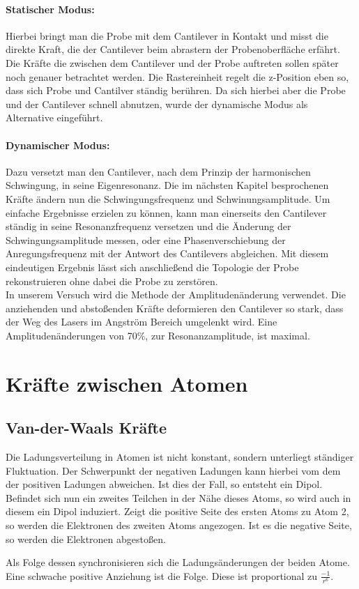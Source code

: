 \paragraph{Statischer Modus:}

Hierbei bringt man die Probe mit dem Cantilever in Kontakt und misst die direkte Kraft, die der Cantilever beim abrastern der Probenoberfläche erfährt. 
Die Kräfte die zwischen dem Cantilever und der Probe auftreten sollen später noch genauer betrachtet werden.
Die Rastereinheit regelt die z-Position eben so, dass sich Probe und Cantilver ständig berühren.
Da sich hierbei aber die Probe und der Cantilever schnell abnutzen, wurde der 
dynamische Modus als Alternative eingeführt.

\paragraph{Dynamischer Modus:}

Dazu versetzt man den Cantilever, nach dem Prinzip der harmonischen Schwingung, in seine Eigenresonanz.
Die im nächsten Kapitel besprochenen Kräfte ändern nun die Schwingungsfrequenz und Schwinungsamplitude.
Um einfache Ergebnisse erzielen zu können, kann man einerseits den Cantilever ständig in seine Resonanzfrequenz versetzen und die Änderung der Schwingungsamplitude messen, oder eine Phasenverschiebung der Anregungsfrequenz mit der Antwort des Cantilevers abgleichen.
Mit diesem eindeutigen Ergebnis lässt sich anschließend die Topologie der Probe rekonstruieren ohne dabei die Probe zu zerstören.
\vspace{6pt}\\
In unserem Versuch wird die Methode der Amplitudenänderung verwendet. 
Die anziehenden und abstoßenden Kräfte deformieren den Cantilever so stark, dass der Weg des Lasers im Angström Bereich umgelenkt wird. 
Eine Amplitudenänderungen von 70\%, zur Resonanzamplitude, ist maximal. 


    \section{Kräfte zwischen Atomen}
        \subsection{Van-der-Waals Kräfte}

Die Ladungsverteilung in Atomen ist nicht konstant, sondern unterliegt ständiger 
Fluktuation. Der Schwerpunkt der negativen Ladungen kann hierbei vom dem der
positiven Ladungen abweichen. Ist dies der Fall, so entsteht ein Dipol. 
Befindet sich nun ein zweites Teilchen in der Nähe dieses Atoms, so wird auch
in diesem ein Dipol induziert. Zeigt die positive Seite des ersten Atoms zu Atom 2,
so werden die Elektronen des zweiten Atoms angezogen. Ist es die negative Seite, so
werden die Elektronen abgestoßen. \par
Als Folge dessen synchronisieren sich die Ladungsänderungen der beiden Atome. Eine
schwache positive Anziehung ist die Folge. Diese ist proportional zu $\displaystyle
\frac{-1}{r^6}$.

